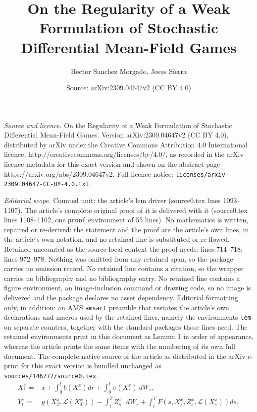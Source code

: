 \documentclass[10pt,a4paper]{amsart}
\title{On the Regularity of a Weak Formulation of Stochastic Differential Mean-Field Games}
\author{Hector Sanchez Morgado, Jesus Sierra}
\date{Source: arXiv:2309.04647v2 (CC BY 4.0)}
\newcommand{\cL}{\mathcal L}
\newcommand{\si}{\sigma}
\begin{document}
\maketitle

\noindent\emph{Source and licence.} On the Regularity of a Weak Formulation of Stochastic Differential Mean-Field Games. Version arXiv:2309.04647v2 (CC BY 4.0), distributed by arXiv under the Creative Commons Attribution 4.0 International licence, http://creativecommons.org/licenses/by/4.0/, as recorded in the arXiv licence metadata for this exact version and shown on the abstract page https://arxiv.org/abs/2309.04647v2. Full licence notice: \texttt{licenses/arxiv-2309.04647-CC-BY-4.0.txt}.\par\smallskip

\noindent\textit{Editorial scope.} Counted unit: the article's lem driver (source0.tex lines 1093--1107). The article's complete original proof of it is delivered with it (source0.tex lines 1108--1162, one \texttt{proof} environment of 55 lines). No mathematics is written, repaired or re-derived: the statement and the proof are the article's own lines, in the article's own notation, and no retained line is substituted or re-flowed.  Retained uncounted as the source-local context the proof needs: lines 714--718; lines 972--978.  Nothing was omitted from any retained span, so the package carries no omission record.  No retained line contains a citation, so the wrapper carries no bibliography and no bibliography entry.  No retained line contains a figure environment, an image-inclusion command or drawing code, so no image is delivered and the package declares no asset dependency.  Editorial formatting only, in addition: an AMS \texttt{amsart} preamble that restates the article's own declarations and macros used by the retained lines, namely the environments \texttt{lem} on separate counters, together with the standard packages those lines need.  The retained environments print in this document as Lemma 1 in order of appearance, whereas the article prints the same items with the numbering of its own full document.  The complete native source of the article as distributed in the arXiv e-print for this exact version is bundled unchanged as \texttt{sources/146777/source0.tex}.
\begin{align}
X_t^x= & x+\int_0^tb(X_s^x)dr+\int_0^t\si(X_s^x)\ dW_s,\label{eq:SDE}\\
Y_t^x= & g(X^x_T,\cL(X^x_T))-\int_t^TZ_s^x\cdot
         dW_s+\int_t^TF(s,X_s^x,Z_s^x,\cL(X_s^x)) ds,\label{eq:BSDE}
\end{align}
\end{document}
